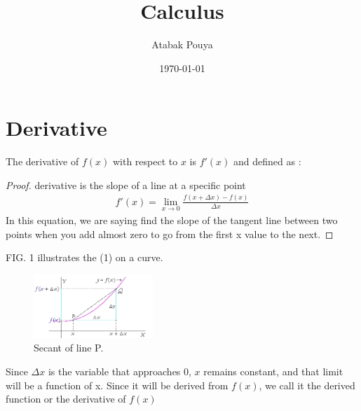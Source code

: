 \documentclass[aps,pra,notitlepage,amsmath,amssymb,letterpaper,12pt]{revtex4-1}
\newenvironment{definition}[2][Definition]{\begin{trivlist}
\item[\hskip \labelsep {\bfseries #1}\hskip \labelsep {\bfseries #2.}]}{\end{trivlist}}
\begin{document}
 
\title{Calculus}
\author{Atabak Pouya}
\date{\today}

\maketitle

\section{Derivative} %

\begin{definition}{1.1}
The derivative of $f(x)$ with respect to $x$ is $f'(x)$ and defined as :
\end{definition}
 
\begin{proof} %
 derivative is the slope of a line at a specific point
\begin{align}
f'(x) = \lim_{x \rightarrow 0} \frac{f(x+\Delta{x})-f(x)}{\Delta{x}}
\end{align}
In this equation, we are saying
find the slope of the tangent line between two points when you add almost zero to go from the first x value to the next.
\end{proof}



FIG. 1 illustrates the (1) on a curve.

\begin{figure}[h!] %
  \includegraphics[width=0.4\textwidth]{Secant.png}  %
  \caption{Secant of line P.}
  \label{fig:figlabel}
\end{figure}

Since $\Delta{x}$ is the variable that approaches 0, $x$ remains constant, and that limit will be a function of x.  Since it will be derived from $f(x)$, we call it the derived function or the derivative of $f(x)$
 
 
\end{document}
